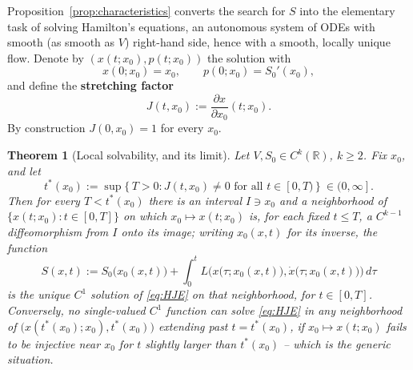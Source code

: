 \documentclass[11pt]{article}
\theoremstyle{plain}
\newtheorem{theorem}{Theorem}[section]
\theoremstyle{definition}
\theoremstyle{remark}
\begin{document}
Proposition~\ref{prop:characteristics} converts the search for $S$ into the
elementary task of solving Hamilton's equations, an autonomous system of ODEs
with smooth (as smooth as $V$) right-hand side, hence with a smooth, locally
unique flow. Denote by $(x(t;x_0),p(t;x_0))$ the solution with
\[
x(0;x_0)=x_0, \qquad p(0;x_0)=S_0'(x_0),
\]
and define the \textbf{stretching factor}
\begin{equation}
J(t,x_0) := \frac{\partial x}{\partial x_0}(t;x_0).
\label{eq:Jdef}
\end{equation}
By construction $J(0,x_0)=1$ for every $x_0$.

\begin{theorem}[Local solvability, and its limit]
\label{thm:local}
Let $V,S_0\in C^k(\mathbb{R})$, $k\ge 2$. Fix $x_0$, and let
\begin{equation}
t^\ast(x_0) := \sup\{\,T>0 : J(t,x_0)\ne 0 \text{ for all } t\in[0,T)\,\} \ \in (0,\infty].
\label{eq:tstar}
\end{equation}
Then for every $T<t^\ast(x_0)$ there is an interval $I\ni x_0$ and a
    neighborhood of $\{x(t;x_0): t\in[0,T]\}$ on which $x_0\mapsto x(t;x_0)$
    is, for each fixed $t\le T$, a $C^{k-1}$ diffeomorphism from $I$ onto its
    image; writing $x_0(x,t)$ for its inverse, the function
\[
S(x,t) := S_0\big(x_0(x,t)\big) + \int_0^t L\Big(x\big(\tau;x_0(x,t)\big),
    \dot x\big(\tau;x_0(x,t)\big)\Big)\,d\tau
\]
is the unique $C^1$ solution of \eqref{eq:HJE} on that neighborhood, for
    $t\in[0,T]$. Conversely, no single-valued $C^1$ function can solve
    \eqref{eq:HJE} in any neighborhood of
    $\big(x(t^\ast(x_0);x_0),t^\ast(x_0)\big)$ extending past $t=t^\ast(x_0)$,
    if $x_0\mapsto x(t;x_0)$ fails to be injective near $x_0$ for $t$ slightly
    larger than $t^\ast(x_0)$ -- which is the generic situation.
\end{theorem}
\end{document}
